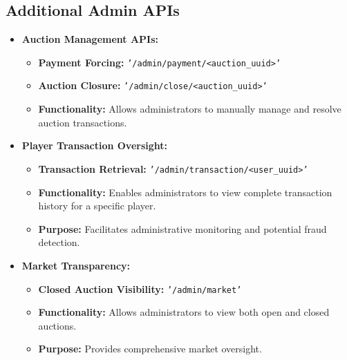 \documentclass{article}
\begin{document}
\subsection{Additional Admin APIs}
\begin{itemize}
    \item \textbf{Auction Management APIs:}
          \begin{itemize}
              \item \textbf{Payment Forcing:} \texttt{'/admin/payment/<auction\_uuid>'}
              \item \textbf{Auction Closure:} \texttt{'/admin/close/<auction\_uuid>'}
              \item \textbf{Functionality:} Allows administrators to manually manage and resolve auction transactions.
          \end{itemize}

    \item \textbf{Player Transaction Oversight:}
          \begin{itemize}
              \item \textbf{Transaction Retrieval:} \texttt{'/admin/transaction/<user\_uuid>'}
              \item \textbf{Functionality:} Enables administrators to view complete transaction history for a specific player.
              \item \textbf{Purpose:} Facilitates administrative monitoring and potential fraud detection.
          \end{itemize}

    \item \textbf{Market Transparency:}
          \begin{itemize}
              \item \textbf{Closed Auction Visibility:} \texttt{'/admin/market'}
              \item \textbf{Functionality:} Allows administrators to view both open and closed auctions.
              \item \textbf{Purpose:} Provides comprehensive market oversight.
          \end{itemize}


\end{itemize}
\end{document}
